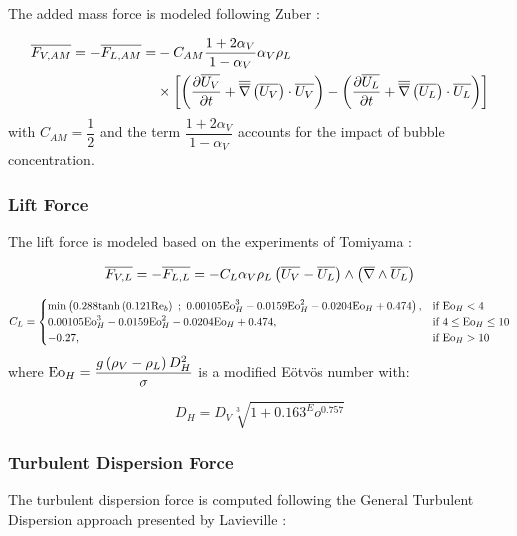 The added mass force is modeled  following Zuber \cite{zuber_dispersed_1964}:

\begin{align}
\overline{F_{V,AM}}=-\overline{F_{L,AM}}=&-C_{AM} \frac{1+2\alpha_{V}}{1-\alpha_{V}}\alpha_{V}\rho_{L}\\
&\times \left[  \left( \frac{\partial{\overline{U_{V}}}}{\partial t}+\overline{\overline{\nabla}}\left({\overline{U_{V}}}\right)\cdot \overline{U_{V}}  \right) - \left( \frac{\partial{\overline{U_{L}}}}{\partial t}+\overline{\overline{\nabla}}\left({\overline{U_{L}}}\right)\cdot \overline{U_{L}}  \right)  \right]
\label{eq:ncfd_added_mass}
\end{align}
with $C_{AM}=\dfrac{1}{2}$ and the term $\dfrac{1+2\alpha_{V}}{1-\alpha_{V}}$ accounts for the impact of bubble concentration.

\subsubsection{Lift Force}

The lift force is modeled based on the experiments of Tomiyama \etal \cite{tomiyama_transverse_2002}:

\begin{equation}
\overline{F_{V,L}}=-\overline{F_{L,L}}=-C_{L}\alpha_{V}\rho_{L}\left( \overline{U_{V}}-\overline{U_{L}}  \right)\wedge \left( \overline{\nabla}\wedge{\overline{U_{L}}}  \right)
\label{eq:ncfd_lift}
\end{equation}

\begin{equation}
C_{L} = \begin{cases}
    \min{0.288\tanh{0.121\Re_{b}}\ ;\ 0.00105 \Eo_{H}^{3}-0.0159\Eo_{H}^{2} - 0.0204\Eo_{H}+0.474}, & \text{if}\ \Eo_{H}<4\\
   0.00105 \Eo_{H}^{3}-0.0159\Eo_{H}^{2} - 0.0204\Eo_{H}+0.474, & \text{if}\ 4\leq \Eo_{H} \leq 10\\
   -0.27, & \text{if}\ \Eo_{H}>10
  \end{cases}
\end{equation}
where $\mathrm{Eo}_{H} = \dfrac{g\left( \rho_{V}-\rho_{L} \right)D_{H}^{2}}{\sigma}$ is a modified E\"otv\"os number with:

\begin{equation}
D_{H} = D_{V}\sqrt[3]{1+0.163^Eo^{0.757}}
\end{equation}

\subsubsection{Turbulent Dispersion Force}

The turbulent dispersion force is computed following the General Turbulent Dispersion approach presented by Lavieville \etal \cite{lavieville_generalized_2017}:

